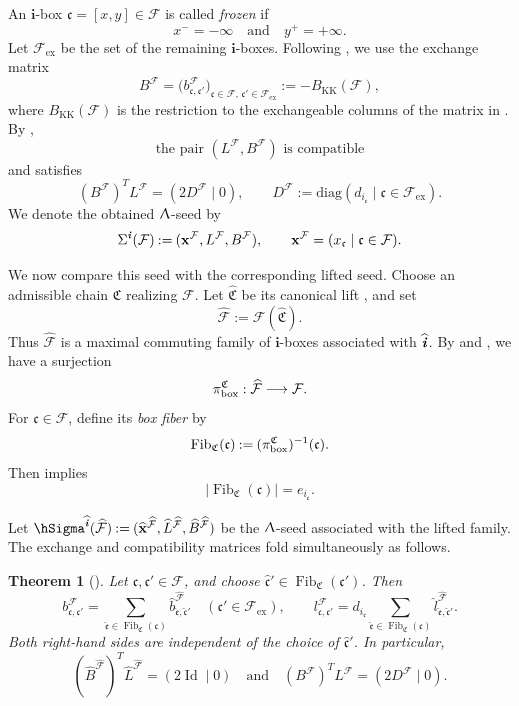 \documentclass[12pt, leqno]{amsart}
\numberwithin{equation}{section}
\theoremstyle{plain}
\newtheorem{theorem}[lemma]{Theorem}
\theoremstyle{definition}
\newcommand{\seteq}{\mathbin{:=}}
\newcommand{\ex}{\mathrm{ex}}
\newcommand{\bx}{{\rm box}}
\newcommand{\ii}{ \textbf{\textit{i}}}
\newcommand{\Fib}{\operatorname{Fib}}
\newcommand{\hL}{\widehat{L}}
\newcommand{\hb}{\widehat{b}}
\newcommand{\hl}{\widehat{l}}
\newcommand{\hii}{{\widehat{\ii}}}
\newcommand{\frakC}{\mathfrak{C}}
\newcommand{\frakc}{\mathfrak{c}}
\newcommand{\frake}{\mathfrak{e}}
\newcommand{\hfrakC}{\widehat{\frakC}}
\newcommand{\hfrakc}{\widehat{\frakc}}
\newcommand{\hfrake}{\widehat{\frake}}
\newcommand{\hbfx}{\widehat{\bfx}}
\newcommand{\bfi}{\mathbf{i}}
\newcommand{\bfx}{\mathbf{x}}
\newcommand{\calF}{\mathcal{F}}
\newcommand{\hcalF}{{\widehat{\calF}}}
\newcommand{\diag}{\mathrm{diag}}
\newcommand{\qtq}[1][{and}]{\quad\text{{#1}}\quad}
\begin{document}
An \(\bfi\)-box \(\frakc=[x,y]\in\calF\) is called
\emph{frozen} if
\[
x^-=-\infty \qtq y^+=+\infty.
\]
Let \(\calF_{\ex}\) be the set of the remaining \(\bfi\)-boxes.
Following \cite[Section~3.3]{JO26}, we use the exchange matrix
\[
B^\calF = \bigl(b_{\frakc,\frakc'}^\calF\bigr)_{\frakc\in\calF,\,\frakc'\in\calF_{\ex}}
\seteq -B_{\mathrm{KK}}(\calF),
\]
where \(B_{\mathrm{KK}}(\calF)\) is the restriction to the
exchangeable columns of the matrix in \cite[(3.1)]{KK24}. By \cite[Theorem~3.5]{JO26}, 
\[
\text{the pair \((L^\calF,B^\calF)\) is compatible}
\]
and satisfies
\begin{equation}\label{eq: compatibility of box seed}
(B^\calF)^TL^\calF = (2D^\calF\mid0),  \qquad D^\calF \seteq \diag(d_{i_\frakc}\mid\frakc\in\calF_{\ex}).
\end{equation}
We denote the obtained \(\Uplambda\)-seed by
\[
\Sigma^\ii(\calF) \seteq (\bfx^\calF,L^\calF,B^\calF),
\qquad
\bfx^\calF = (x_\frakc\mid\frakc\in\calF).
\]
 

We now compare this seed with the corresponding lifted seed.  Choose an admissible chain \(\frakC\) realizing \(\calF\).
Let \(\hfrakC\) be its canonical lift
\cite[Section~3.4]{JO26}, and set
\[
\hcalF\seteq\calF(\hfrakC).
\] 
Thus \(\hcalF\) is a
maximal commuting family of \(\bfi\)-boxes associated with
\(\hii\).  By \cite[Section~2.2]{KK24} and \cite[Section~3.4]{JO26},
we have a surjection 
\[
\pi_{\bx}^{\frakC}: \hcalF\longrightarrow\calF. 
\]
For \(\frakc\in\calF\), define its \emph{box fiber} by
\[
\Fib_{\frakC}(\frakc) \seteq (\pi_{\bx}^{\frakC})^{-1}(\frakc). 
\]
Then \cite[Section~3.4]{JO26} implies
\begin{equation}\label{eq: cardinality of box fiber}
|\Fib_{\frakC}(\frakc)|=e_{i_\frakc}.
\end{equation}


Let $\hSigma^\hii(\hcalF) \seteq (\hbfx^{\hcalF},  \hL^{\hcalF},  \widehat{B}^{\hcalF})$ 
be the \(\Uplambda\)-seed associated with the lifted family.  The
exchange and compatibility matrices fold simultaneously as follows.

\begin{theorem}[{\cite[Theorem~3.15]{JO26}}]
\label{thm: folding of box compatible pairs}
Let \(\frakc,\frakc'\in\calF\), and choose
\(\hfrakc'\in\Fib_{\frakC}(\frakc')\).
Then
\[
b_{\frakc,\frakc'}^\calF = \sum_{\hfrake\in\Fib_{\frakC}(\frakc)} \hb_{\hfrake,\hfrakc'}^{\hcalF}
\quad(\frakc'\in\calF_{\ex}),
\qquad
l_{\frakc,\frakc'}^\calF = d_{i_\frakc} \sum_{\hfrake\in\Fib_{\frakC}(\frakc)} \hl_{\hfrake,\hfrakc'}^{\hcalF}.
\]
Both right-hand sides are independent of the choice of
\(\hfrakc'\).  In particular,
\[
(\widehat{B}^{\hcalF})^T \hL^{\hcalF} = (2\operatorname{Id}\mid0) 
\qtq
(B^\calF)^TL^\calF = (2D^\calF\mid0).
\]
\end{theorem}
\end{document}
